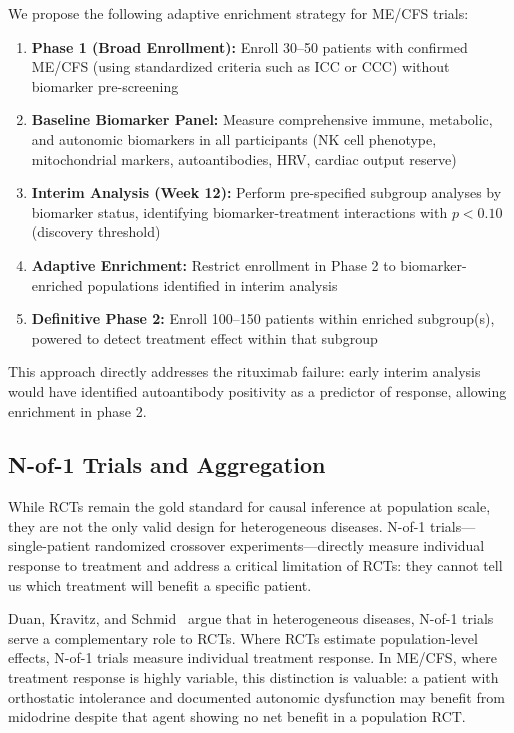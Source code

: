 We propose the following adaptive enrichment strategy for ME/CFS trials:
\begin{enumerate}
    \item \textbf{Phase 1 (Broad Enrollment):} Enroll 30--50 patients with confirmed ME/CFS (using standardized criteria such as ICC or CCC) without biomarker pre-screening
    \item \textbf{Baseline Biomarker Panel:} Measure comprehensive immune, metabolic, and autonomic biomarkers in all participants (NK cell phenotype, mitochondrial markers, autoantibodies, HRV, cardiac output reserve)
    \item \textbf{Interim Analysis (Week 12):} Perform pre-specified subgroup analyses by biomarker status, identifying biomarker-treatment interactions with $p < 0.10$ (discovery threshold)
    \item \textbf{Adaptive Enrichment:} Restrict enrollment in Phase 2 to biomarker-enriched populations identified in interim analysis
    \item \textbf{Definitive Phase 2:} Enroll 100--150 patients within enriched subgroup(s), powered to detect treatment effect within that subgroup
\end{enumerate}

This approach directly addresses the rituximab failure: early interim analysis would have identified autoantibody positivity as a predictor of response, allowing enrichment in phase 2.

\subsection{N-of-1 Trials and Aggregation}

While RCTs remain the gold standard for causal inference at population scale, they are not the only valid design for heterogeneous diseases. N-of-1 trials---single-patient randomized crossover experiments---directly measure individual response to treatment and address a critical limitation of RCTs: they cannot tell us which treatment will benefit a specific patient.

Duan, Kravitz, and Schmid~\cite{Duan2013} argue that in heterogeneous diseases, N-of-1 trials serve a complementary role to RCTs. Where RCTs estimate population-level effects, N-of-1 trials measure individual treatment response. In ME/CFS, where treatment response is highly variable, this distinction is valuable: a patient with orthostatic intolerance and documented autonomic dysfunction may benefit from midodrine despite that agent showing no net benefit in a population RCT.

